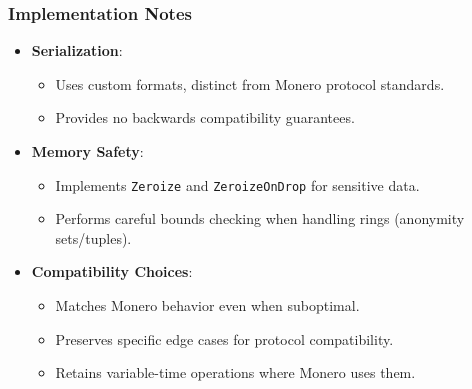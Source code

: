 \documentclass[12pt,a4paper]{article}
\begin{document}
\subsubsection{Implementation Notes}
\begin{itemize}
  \item \textbf{Serialization}:
    \begin{itemize}
      \item Uses custom formats, distinct from Monero protocol standards.  %
      \item Provides no backwards compatibility guarantees.  %
    \end{itemize}
  \item \textbf{Memory Safety}:
    \begin{itemize}
      \item Implements \texttt{Zeroize} and \texttt{ZeroizeOnDrop} for sensitive data.  %
      \item Performs careful bounds checking when handling rings (anonymity sets/tuples). %
    \end{itemize}
  \item \textbf{Compatibility Choices}:
    \begin{itemize}
      \item Matches Monero behavior even when suboptimal.  %
      \item Preserves specific edge cases for protocol compatibility.  %
      \item Retains variable-time operations where Monero uses them. %
    \end{itemize}
\end{itemize}
\end{document}
